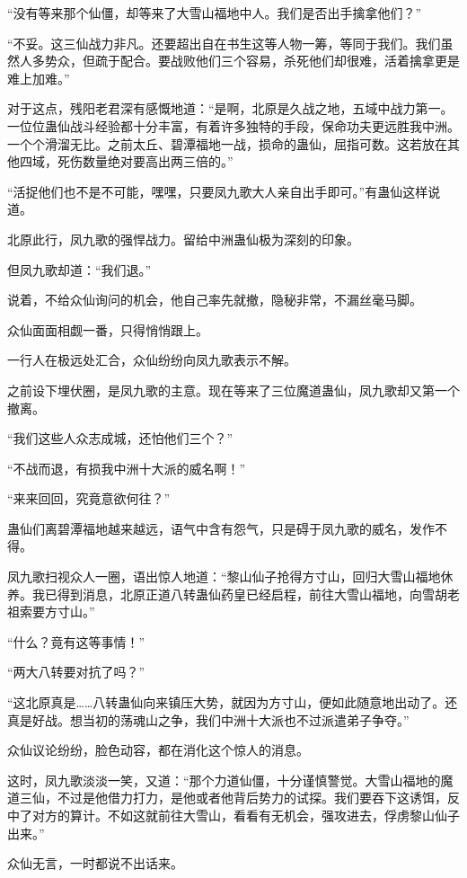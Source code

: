 \begin{this_body}
“没有等来那个仙僵，却等来了大雪山福地中人。我们是否出手擒拿他们？”

“不妥。这三仙战力非凡。还要超出自在书生这等人物一筹，等同于我们。我们虽然人多势众，但疏于配合。要战败他们三个容易，杀死他们却很难，活着擒拿更是难上加难。”

对于这点，残阳老君深有感慨地道：“是啊，北原是久战之地，五域中战力第一。一位位蛊仙战斗经验都十分丰富，有着许多独特的手段，保命功夫更远胜我中洲。一个个滑溜无比。之前太丘、碧潭福地一战，损命的蛊仙，屈指可数。这若放在其他四域，死伤数量绝对要高出两三倍的。”

“活捉他们也不是不可能，嘿嘿，只要凤九歌大人亲自出手即可。”有蛊仙这样说道。

北原此行，凤九歌的强悍战力。留给中洲蛊仙极为深刻的印象。

但凤九歌却道：“我们退。”

说着，不给众仙询问的机会，他自己率先就撤，隐秘非常，不漏丝毫马脚。

众仙面面相觑一番，只得悄悄跟上。

一行人在极远处汇合，众仙纷纷向凤九歌表示不解。

之前设下埋伏圈，是凤九歌的主意。现在等来了三位魔道蛊仙，凤九歌却又第一个撤离。

“我们这些人众志成城，还怕他们三个？”

“不战而退，有损我中洲十大派的威名啊！”

“来来回回，究竟意欲何往？”

蛊仙们离碧潭福地越来越远，语气中含有怨气，只是碍于凤九歌的威名，发作不得。

凤九歌扫视众人一圈，语出惊人地道：“黎山仙子抢得方寸山，回归大雪山福地休养。我已得到消息，北原正道八转蛊仙药皇已经启程，前往大雪山福地，向雪胡老祖索要方寸山。”

“什么？竟有这等事情！”

“两大八转要对抗了吗？”

“这北原真是……八转蛊仙向来镇压大势，就因为方寸山，便如此随意地出动了。还真是好战。想当初的荡魂山之争，我们中洲十大派也不过派遣弟子争夺。”

众仙议论纷纷，脸色动容，都在消化这个惊人的消息。

这时，凤九歌淡淡一笑，又道：“那个力道仙僵，十分谨慎警觉。大雪山福地的魔道三仙，不过是他借力打力，是他或者他背后势力的试探。我们要吞下这诱饵，反中了对方的算计。不如这就前往大雪山，看看有无机会，强攻进去，俘虏黎山仙子出来。”

众仙无言，一时都说不出话来。


\end{this_body}
